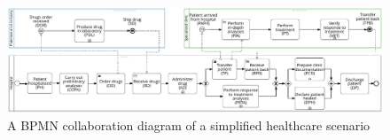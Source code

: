 \def\Talice{\Activ{PH, COPA, OD, \color{pharmacolor}DOR, PDL, SD, \color{black}RD, AD, TP, \color{specializedcliniccolor}PAFH, PIA, PT, VRT, TPB, \color{black}RPB, DPH, PCD, DP}}
\def\Tbob{\Activ{PH, COPA, OD, \color{pharmacolor}DOR, PDL, SD, \color{black}RD, AD, TP, DPH, PCD, DP}}
\def\TaliceUncolored{\Activ{PH, COPA, OD, DOR, PDL, SD, RD, AD, TP, PAFH, PIA, PT, VRT, TPB, RPB, DPH, PCD, DP}}
\def\TbobUncolored{\Activ{PH, COPA, OD, DOR, PDL, SD, RD, AD, TP, DPH, PCD, DP}}
\begin{figure}[t]
\centering
\includegraphics[width=\linewidth]{content/figures/bpmnHealthcare2.pdf}
\caption{A BPMN collaboration diagram of a simplified healthcare scenario}
\label{fig:BPMN_Healthcare}
\end{figure}
